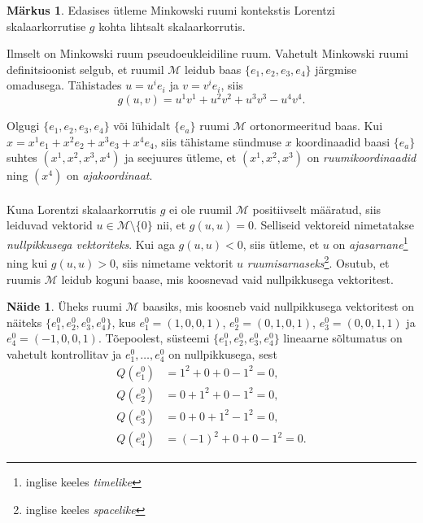 \documentclass[a4paper,12pt]{article}
\theoremstyle{plain}
\theoremstyle{definition}
\newtheorem{naide}{Näide}[section]
\newtheorem{markus}{Märkus}[section]
\numberwithin{equation}{section}
\begin{document}
\begin{markus}
Edasises ütleme Minkowski ruumi kontekstis Lorentzi skalaarkorrutise $g$ kohta lihtsalt skalaarkorrutis.
\end{markus}

Ilmselt on Minkowski ruum pseudoeukleidiline ruum. Vahetult Minkowski ruumi definitsioonist selgub, et ruumil $\mathcal{M}$ leidub baas $\{e_1, e_2, e_3, e_4\}$ järgmise omadusega. Tähistades $u = u^i e_i$ ja $v = v^i e_i$, siis
\[g\left(u, v\right) = u^1 v^1 + u^2 v^2 + u^3 v^3 - u^4 v^4.\]

Olgugi $\{e_1, e_2, e_3, e_4\}$ või lühidalt $\{e_a\}$ ruumi $\mathcal{M}$ ortonormeeritud baas. 
Kui $x = x^1 e_1 + x^2 e_2 + x^3 e_3 + x^4 e_4$, siis tähistame sündmuse $x$ koordinaadid baasi $\{e_a\}$ suhtes $\left( x^1, x^2, x^3, x^4 \right)$ ja seejuures ütleme, et $\left( x^1, x^2, x^3 \right)$ on \emph{ruumikoordinaadid} ning $\left(x^4\right)$ on \emph{ajakoordinaat}.
\paragraph{}
Kuna Lorentzi skalaarkorrutis $g$ ei ole ruumil $\mathcal{M}$ positiivselt määratud, siis leiduvad vektorid $u \in \mathcal{M} \setminus \{0\}$ nii, et $g \left(u, u\right) = 0$. Selliseid vektoreid nimetatakse \emph{nullpikkusega vektoriteks}. Kui aga $g \left(u, u\right) < 0$, siis ütleme, et $u$ on \emph{ajasarnane}\footnote{inglise keeles \textit{timelike}} ning kui $g \left(u, u\right) > 0$, siis nimetame vektorit $u$ \emph{ruumisarnaseks}\footnote{inglise keeles \textit{spacelike}}. Osutub, et ruumis $\mathcal{M}$ leidub koguni baase, mis koosnevad vaid nullpikkusega vektoritest.

\begin{naide}
Üheks ruumi $\mathcal{M}$ baasiks, mis koosneb vaid nullpikkusega vektoritest on näiteks $\{e_1^0, e_2^0, e_3^0, e_4^0\}$, kus $e_1^0 = \left(1, 0, 0, 1\right)$, $e_2^0 = \left(0, 1, 0, 1\right)$, $e_3^0 = \left(0, 0, 1, 1\right)$ ja $e_4^0 = \left(-1, 0, 0, 1\right).$
Tõepoolest, süsteemi $\{e_1^0, e_2^0, e_3^0, e_4^0\}$ lineaarne sõltumatus on vahetult kontrollitav ja $e_1^0, \dots, e_4^0$ on nullpikkusega, sest
\begin{align*}
Q\left(e_1^0\right) &= 1^2 + 0 + 0 - 1^2 = 0, \\
Q\left(e_2^0\right) &= 0 + 1^2 + 0 - 1^2 = 0, \\
Q\left(e_3^0\right) &= 0 + 0 + 1^2 - 1^2 = 0, \\
Q\left(e_4^0\right) &= (-1)^2 + 0 + 0 - 1^2 = 0.
\end{align*}
\end{naide}
\end{document}

